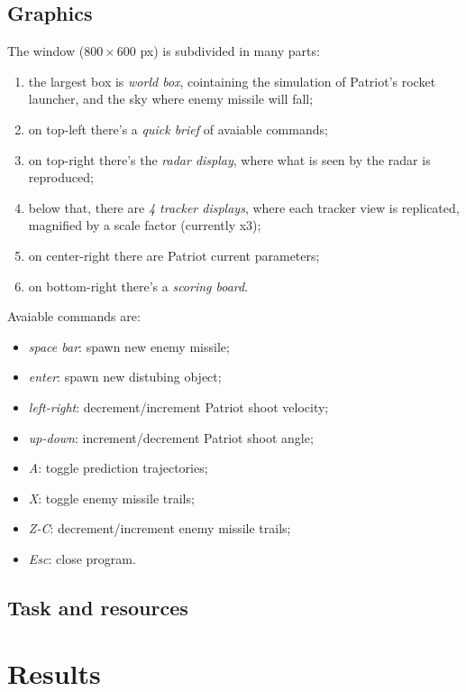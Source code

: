 \documentclass[notitlepage,a4paper,11pt]{article} %
\begin{document}
	\subsection{Graphics}
		The window ($800 \times 600$ px) is subdivided in many parts:
		\begin{enumerate}
			\item the largest box is \emph{world box}, cointaining the simulation of Patriot's rocket launcher, and the sky where enemy missile will fall;
			\item on top-left there's a \emph{quick brief} of avaiable commands;
			\item on top-right there's the \emph{radar display}, where what is seen by the radar is reproduced;
			\item below that, there are \emph{4 tracker displays}, where each tracker view is replicated, magnified by a scale factor (currently x3);
			\item on center-right there are Patriot current parameters;
			\item on bottom-right there's a \emph{scoring board}.
		\end{enumerate}
		Avaiable commands are:
		\begin{itemize}
			\item \emph{space bar}: spawn new enemy missile;
			\item \emph{enter}: spawn new distubing object;
			\item \emph{left-right}: decrement/increment Patriot shoot velocity;
			\item \emph{up-down}: increment/decrement Patriot shoot angle;
			\item \emph{A}: toggle prediction trajectories;
			\item \emph{X}: toggle enemy missile trails;
			\item \emph{Z-C}: decrement/increment enemy missile trails;
			\item \emph{Esc}: close program.
		\end{itemize}

	\subsection{Task and resources}
\section{Results}

\hypersetup{linkcolor=black}
\listoffigures %
\hypersetup{linkcolor=blue}
\end{document}
